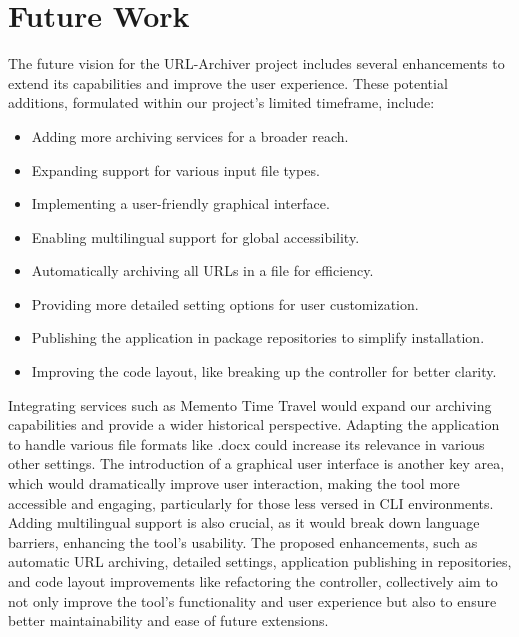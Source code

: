 \section{Future Work}
The future vision for the URL-Archiver project includes several enhancements to extend its capabilities and improve the user experience.
These potential additions, formulated within our project's limited timeframe, include:

\begin{itemize}
    \item Adding more archiving services for a broader reach.
    \item Expanding support for various input file types.
    \item Implementing a user-friendly graphical interface.
    \item Enabling multilingual support for global accessibility.
    \item Automatically archiving all URLs in a file for efficiency.
    \item Providing more detailed setting options for user customization.
    \item Publishing the application in package repositories to simplify installation.
    \item Improving the code layout, like breaking up the controller for better clarity.
\end{itemize}

Integrating services such as Memento Time Travel would expand our archiving capabilities and provide a wider historical perspective.
Adapting the application to handle various file formats like .docx could increase its relevance in various other settings.
The introduction of a graphical user interface is another key area, which would dramatically improve user interaction, making the tool more accessible and engaging, particularly for those less versed in CLI environments.
Adding multilingual support is also crucial, as it would break down language barriers, enhancing the tool's usability.
The proposed enhancements, such as automatic URL archiving, detailed settings, application publishing in repositories, and code layout improvements like refactoring the controller, collectively aim to not only improve the tool's functionality and user experience but also to ensure better maintainability and ease of future extensions.
